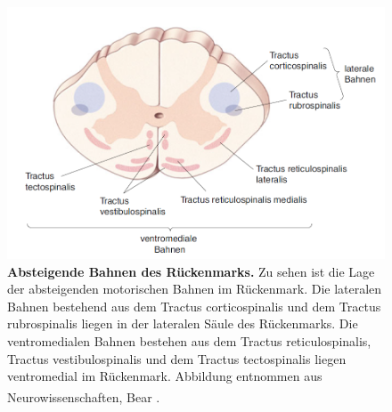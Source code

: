 \documentclass[12pt,a4paper,pdftex]{article}
\begin{document}
\begin{figure}[H]
    \centering
    \includegraphics[width=1\textwidth]{pictures/Bilder_Laura/absteigende_bahnen_rkm.png}
    \caption[Absteigende Bahnen des Rückenmarks]{\textbf{Absteigende Bahnen des Rückenmarks.} Zu sehen ist die Lage der absteigenden motorischen Bahnen im Rückenmark. Die lateralen Bahnen bestehend aus dem Tractus corticospinalis und dem Tractus rubrospinalis liegen in der lateralen Säule des Rückenmarks. Die ventromedialen Bahnen bestehen aus dem Tractus reticulospinalis, Tractus vestibulospinalis und dem Tractus tectospinalis  liegen ventromedial im Rückenmark. Abbildung entnommen aus Neurowissenschaften, Bear \textsuperscript{\cite[14]{neurowissenschaften_baer}}.}
    \label{fig:abst_Rueckenmark}
\end{figure}
\end{document}
